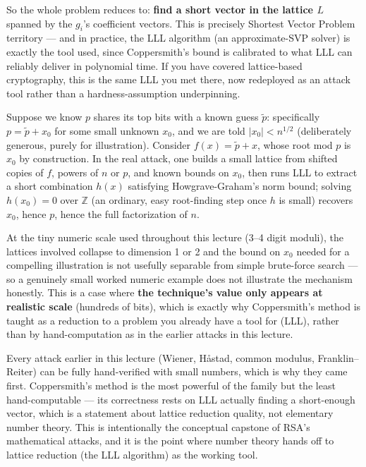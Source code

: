 So the whole problem reduces to: \textbf{find a short vector in the lattice $L$} spanned by the $g_i$'s coefficient vectors. This is precisely Shortest Vector Problem territory — and in practice, the LLL algorithm (an approximate-SVP solver) is exactly the tool used, since Coppersmith's bound is calibrated to what LLL can reliably deliver in polynomial time. If you have covered lattice-based cryptography, this is the same LLL you met there, now redeployed as an attack tool rather than a hardness-assumption underpinning.

\begin{example}
Suppose we know $p$ shares its top bits with a known guess $\tilde{p}$: specifically $p = \tilde p + x_0$ for some small unknown $x_0$, and we are told $|x_0| < n^{1/2}$ (deliberately generous, purely for illustration). Consider $f(x) = \tilde p + x$, whose root mod $p$ is $x_0$ by construction. In the real attack, one builds a small lattice from shifted copies of $f$, powers of $n$ or $p$, and known bounds on $x_0$, then runs LLL to extract a short combination $h(x)$ satisfying Howgrave-Graham's norm bound; solving $h(x_0)=0$ over $\mathbb{Z}$ (an ordinary, easy root-finding step once $h$ is small) recovers $x_0$, hence $p$, hence the full factorization of $n$.

At the tiny numeric scale used throughout this lecture (3–4 digit moduli), the lattices involved collapse to dimension 1 or 2 and the bound on $x_0$ needed for a compelling illustration is not usefully separable from simple brute-force search — so a genuinely small worked numeric example does not illustrate the mechanism honestly. This is a case where \textbf{the technique's value only appears at realistic scale} (hundreds of bits), which is exactly why Coppersmith's method is taught as a reduction to a problem you already have a tool for (LLL), rather than by hand-computation as in the earlier attacks in this lecture.
\end{example}

\begin{remark}
Every attack earlier in this lecture (Wiener, Håstad, common modulus, Franklin--Reiter) can be fully hand-verified with small numbers, which is why they came first. Coppersmith's method is the most powerful of the family but the least hand-computable — its correctness rests on LLL actually finding a short-enough vector, which is a statement about lattice reduction quality, not elementary number theory. This is intentionally the conceptual capstone of RSA's mathematical attacks, and it is the point where number theory hands off to lattice reduction (the LLL algorithm) as the working tool.
\end{remark}

